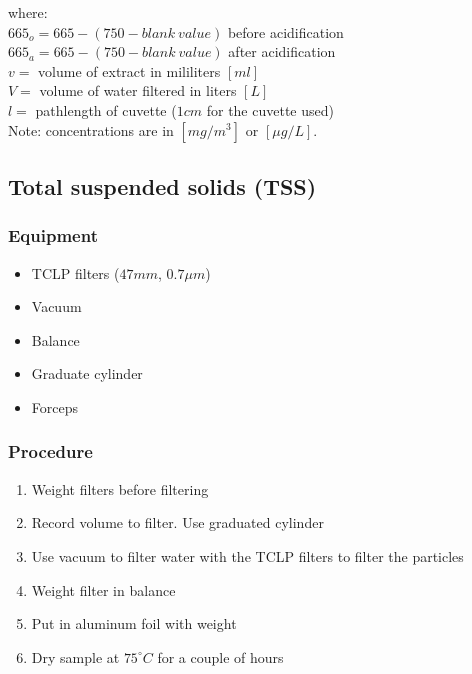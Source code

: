 \begin{appendices}
\noindent where: \\
$665_o = 665 - (750-blank~value)$ before acidification\\
$665_a = 665 - (750-blank~value)$ after acidification  \\
$v = $ volume of extract in mililiters $[ml]$ \\
$V = $ volume of water filtered in liters $[L]$ \\
$l = $ pathlength of cuvette ($1cm$ for the cuvette used) \\

Note: concentrations are in $[mg/m^3]$ or $[\mu g/L]$.


\subsection{Total suspended solids (TSS)}

\subsubsection{Equipment}
\begin{itemize}[itemsep=2pt,parsep=2pt]

  \item TCLP filters ($47 mm$, $0.7\mu m$)
  \item Vacuum
  \item Balance
  \item Graduate cylinder
  \item Forceps

\end{itemize}

\subsubsection{Procedure}
\begin{enumerate}[itemsep=2pt,parsep=2pt]
  \item Weight filters before filtering
  \item Record volume to filter. Use graduated cylinder
  \item Use vacuum to filter water with the TCLP filters to filter the particles
  \item Weight filter in balance
  \item Put in aluminum foil with weight
  \item Dry sample at $75^\circ C$ for a couple of hours
\end{enumerate}


\end{appendices}
